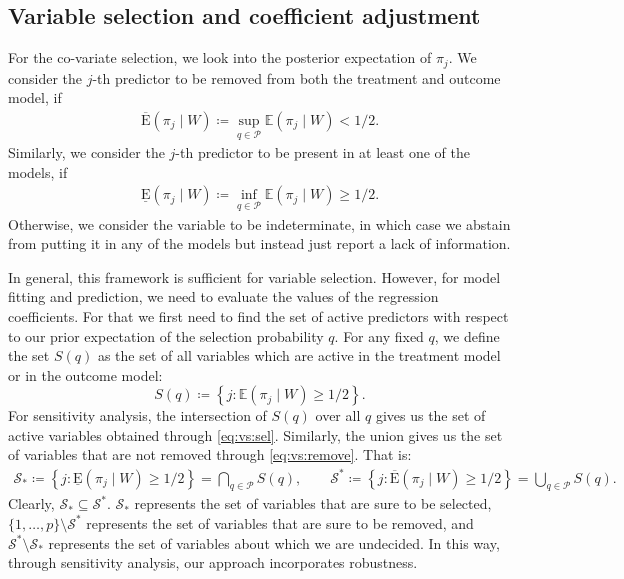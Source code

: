 \documentclass[preprint,12pt]{elsarticle}
\newcommand{\lexp}{\underline{\text{E}}}
\newcommand{\uexp}{\overline{\text{E}}}
\begin{document}
\subsection{Variable selection and coefficient adjustment}
For the co-variate selection, we look into the posterior expectation of $\pi_j$. 
We consider the $j$-th predictor to be removed from both the
treatment and outcome model, if
\begin{align}\label{eq:vs:remove}
	\uexp (\pi_j\mid W)\coloneqq \sup_{q\in \mathcal{P}} \mathbb{E}(\pi_j\mid W) < 1/2.
\end{align}
Similarly, we consider the $j$-th predictor to be present in at least one of the models, if
\begin{align}\label{eq:vs:sel}
	\lexp (\pi_j\mid W)\coloneqq \inf_{q\in \mathcal{P}} \mathbb{E}(\pi_j\mid W) \ge 1/2.
\end{align}
Otherwise, we consider the variable to be indeterminate,  in which case we abstain from putting
it in any of the models but instead just report a lack of information.

In general, this framework is
sufficient
for variable selection. However, for
model fitting and prediction, we need to evaluate the values 
of the regression coefficients. For that we first need to find the set of active
predictors with respect to our prior expectation of the selection probability $q$.
For any fixed $q$, we define the set $S(q)$ as the set of all variables which are active
in the treatment model or in the outcome model:
\begin{equation}
	S(q)\coloneqq
	\left\{j\colon \mathbb{E}(\pi_j\mid W) \ge 1/2\right\}.
\end{equation}
For sensitivity analysis,
the intersection of $S(q)$ over all $q$ gives us the set of
active variables obtained through \cref{eq:vs:sel}.
Similarly, the union gives us the set of
variables that are not removed through \cref{eq:vs:remove}.
That is:
\begin{align}
    \mathcal{S}_*\coloneqq \left\{j:\lexp (\pi_j\mid W)\ge1/2\right\}
    = \bigcap_{q\in \mathcal{P}}S(q),
    \qquad \mathcal{S}^*\coloneqq \left\{j:\uexp (\pi_j\mid W)\ge1/2\right\}
    = \bigcup_{q\in \mathcal{P}}S(q).
\end{align}
Clearly, $\mathcal{S}_*\subseteq\mathcal{S}^*$.
$\mathcal{S}_*$ represents the set of variables that are sure to be selected,
$\{1,\dots,p\}\setminus\mathcal{S}^*$ represents the set of variables that are sure to be removed, and
$\mathcal{S}^*\setminus\mathcal{S}_*$ represents the set of variables about which we are undecided.
In this way, through sensitivity analysis, our approach incorporates robustness.
\end{document}
